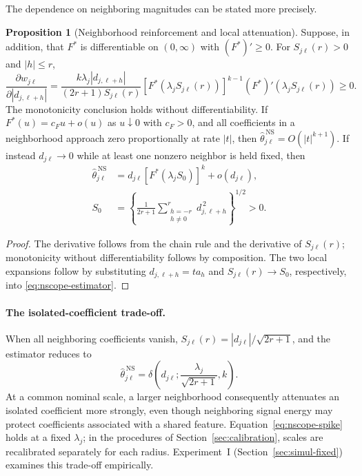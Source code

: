 \documentclass[12pt]{article}
\theoremstyle{definition}
\newtheorem{proposition}{Proposition}
\theoremstyle{definition}
\begin{document}
The dependence on neighboring magnitudes can be stated more precisely.

\begin{proposition}[Neighborhood reinforcement and local attenuation]
\label{prop:nscope-reinforcement}
Suppose, in addition, that $F^*$ is differentiable on $(0,\infty)$ with
$(F^*)'\ge0$. For $S_{j\ell}(r)>0$ and $|h|\le r$,
\begin{equation}
\frac{\partial w_{j\ell}}{\partial |d_{j,\ell+h}|}
=\frac{k\lambda_j|d_{j,\ell+h}|}{(2r+1)S_{j\ell}(r)}
\left[F^*\!\left(\lambda_jS_{j\ell}(r)\right)\right]^{k-1}
(F^*)'\!\left(\lambda_jS_{j\ell}(r)\right)\ge0.
\label{eq:nscope-reinforcement}
\end{equation}
The monotonicity conclusion holds without differentiability. If
$F^*(u)=c_Fu+o(u)$ as $u\downarrow0$ with $c_F>0$, and all coefficients
in a neighborhood approach zero proportionally at rate $|t|$, then
$\widehat\theta_{j\ell}^{\,\mathrm{NS}}=O(|t|^{k+1})$. If instead
$d_{j\ell}\to0$ while at least one nonzero neighbor is held fixed, then
\begin{align}
\widehat\theta_{j\ell}^{\,\mathrm{NS}}
&=d_{j\ell}\left[F^*(\lambda_jS_0)\right]^k+o(d_{j\ell}),
\nonumber\\
S_0&=\left\{\frac{1}{2r+1}
\sum_{\substack{h=-r\\h\ne0}}^{r}d_{j,\ell+h}^{\,2}
\right\}^{1/2}>0.
\label{eq:nscope-isolated}
\end{align}
\end{proposition}

\begin{proof}
The derivative follows from the chain rule and the derivative of
$S_{j\ell}(r)$; monotonicity without differentiability follows by
composition. The two local expansions follow by substituting
$d_{j,\ell+h}=ta_h$ and $S_{j\ell}(r)\to S_0$, respectively, into
\eqref{eq:nscope-estimator}.
\end{proof}

\paragraph{The isolated-coefficient trade-off.}
When all neighboring coefficients vanish,
$S_{j\ell}(r)=|d_{j\ell}|/\sqrt{2r+1}$, and the estimator reduces to
\begin{equation}
\widehat\theta_{j\ell}^{\,\mathrm{NS}}
=\delta\!\left(d_{j\ell};\frac{\lambda_j}{\sqrt{2r+1}},k\right).
\label{eq:nscope-spike}
\end{equation}
At a common nominal scale, a larger neighborhood consequently
attenuates an isolated coefficient more strongly, even though
neighboring signal energy may protect coefficients associated with
a shared feature. Equation~\eqref{eq:nscope-spike} holds at a fixed
$\lambda_j$; in the procedures of Section~\ref{sec:calibration},
scales are recalibrated separately for each radius. Experiment~I
(Section~\ref{sec:simul-fixed}) examines this trade-off empirically.
\end{document}
